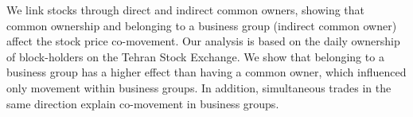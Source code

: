  We link stocks through direct and indirect common owners, showing that common ownership and belonging to a business group (indirect common owner) affect the stock price co-movement. Our analysis is based on the daily ownership of block-holders on the Tehran Stock Exchange. We show that belonging to a business group has a higher effect than having a common owner, which influenced only movement within business groups. In addition, simultaneous trades in the same direction explain co-movement in business groups.
